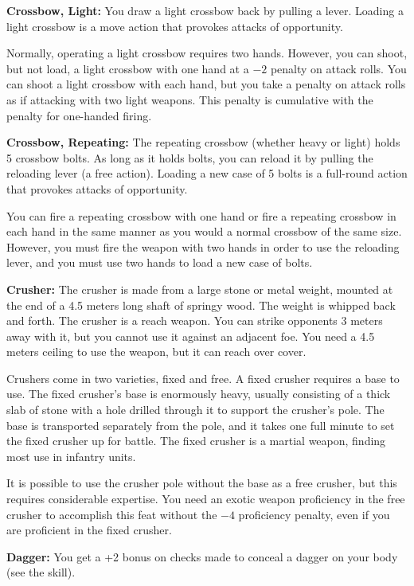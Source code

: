 \textbf{Crossbow, Light:} You draw a light crossbow back by pulling a lever. Loading a light crossbow is a move action that provokes attacks of opportunity.

Normally, operating a light crossbow requires two hands. However, you can shoot, but not load, a light crossbow with one hand at a $-2$ penalty on attack rolls. You can shoot a light crossbow with each hand, but you take a penalty on attack rolls as if attacking with two light weapons. This penalty is cumulative with the penalty for one-handed firing. 

\textbf{Crossbow, Repeating:} The repeating crossbow (whether heavy or light) holds 5 crossbow bolts. As long as it holds bolts, you can reload it by pulling the reloading lever (a free action). Loading a new case of 5 bolts is a full-round action that provokes attacks of opportunity.

You can fire a repeating crossbow with one hand or fire a repeating crossbow in each hand in the same manner as you would a normal crossbow of the same size. However, you must fire the weapon with two hands in order to use the reloading lever, and you must use two hands to load a new case of bolts. 

\textbf{Crusher:} The crusher is made from a large stone or metal weight, mounted at the end of a 4.5 meters long shaft of springy wood. The weight is whipped back and forth. The crusher is a reach weapon. You can strike opponents 3 meters away with it, but you cannot use it against an adjacent foe. You need a 4.5 meters ceiling to use the weapon, but it can reach over cover.

Crushers come in two varieties, fixed and free. A fixed crusher requires a base to use. The fixed crusher's base is enormously heavy, usually consisting of a thick slab of stone with a hole drilled through it to support the crusher's pole. The base is transported separately from the pole, and it takes one full minute to set the fixed crusher up for battle. The fixed crusher is a martial weapon, finding most use in infantry units.

It is possible to use the crusher pole without the base as a free crusher, but this requires considerable expertise. You need an exotic weapon proficiency in the free crusher to accomplish this feat without the $-4$ proficiency penalty, even if you are proficient in the fixed crusher.

\textbf{Dagger:} You get a +2 bonus on  checks made to conceal a dagger on your body (see the  skill). 

